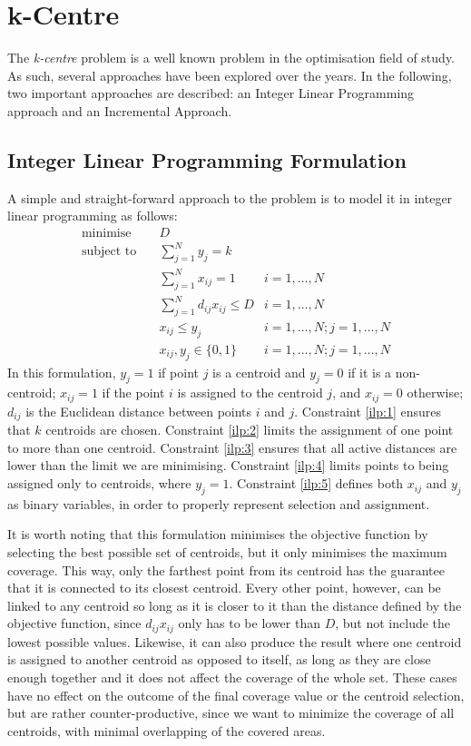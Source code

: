 \section{k-Centre}
The \emph{k-centre} problem is a well known problem in the optimisation field of study. As such, several approaches have been explored over the years. In the following, two important approaches are described: an Integer Linear Programming approach and an Incremental Approach.

\subsection{Integer Linear Programming Formulation}
\label{alg:ilp}

A simple and straight-forward approach to the problem is to model it in  integer linear programming as follows:
\begin{align}
\text{minimise}   \quad& D							   &\\
\text{subject to} \quad
& \sum\limits_{j=1}^{N}{y_j} = k 
& 							\label{ilp:1}\\
& \sum\limits_{j=1}^{N}{x_{ij}}	= 1   
& i=1,\ldots,N 				\label{ilp:2}\\
& \sum\limits_{j=1}^{N}{d_{ij} x_{ij}} \leq D
& i=1,\ldots,N				\label{ilp:3}\\
& x_{ij} \leq y_{j}				   
& i=1,\ldots,N;j=1,\ldots,N	\label{ilp:4}\\
& x_{ij},y_{j} \in \{0,1\}
& i=1,\ldots,N;j=1,\ldots,N \label{ilp:5}
\end{align}
In this formulation, $y_j = 1$ if point $j$ is a centroid and $y_j = 0$ if it is a non-centroid;
$x_{ij} = 1$ if the point $i$ is assigned to the centroid $j$, and $x_{ij}=0$ otherwise;
$d_{ij}$ is the Euclidean distance between points $i$ and $j$.
Constraint \eqref{ilp:1} ensures that $k$ centroids are chosen.
Constraint \eqref{ilp:2} limits the assignment of one point to more than one centroid.
Constraint \eqref{ilp:3} ensures that all active distances are lower than the limit we are minimising.
Constraint \eqref{ilp:4} limits points to being assigned only to centroids, where $y_j=1$.
Constraint \eqref{ilp:5} defines both $x_{ij}$ and $y_j$ as binary variables, in order to properly represent selection and assignment.

It is worth noting that this formulation minimises the objective function by selecting the best possible set of centroids, but it only minimises the maximum coverage. This way, only the farthest point from its centroid has the guarantee that it is connected to its closest centroid.
Every other point, however, can be linked to any centroid so long as it is closer to it than the distance defined by the objective function, since $d_{ij}x_{ij}$ only has to be lower than $D$, but not include the lowest possible values.
Likewise, it can also produce the result where one centroid is assigned to another centroid as opposed to itself, as long as they are close enough together and it does not affect the coverage of the whole set.
These cases have no effect on the outcome of the final coverage value or the centroid selection, but are rather counter-productive, since we want to minimize the coverage of all centroids, with minimal overlapping of the covered areas.


